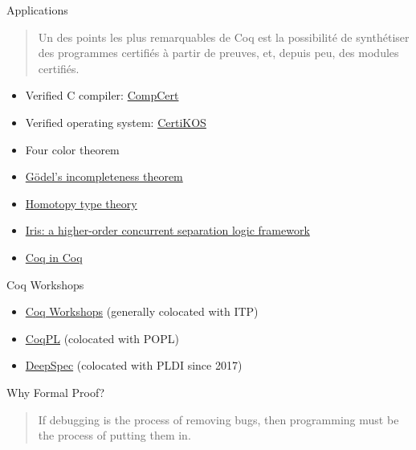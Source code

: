 \documentclass[usenames,xcolor=svgnames,11pt,sans,aspectratio=169]{beamer}
\begin{document}
\begin{frame}{Applications}
  \begin{quote}
    Un des points les plus remarquables de Coq est la possibilité de synthétiser des programmes certifiés à partir de preuves,
    et, depuis peu, des modules certifiés.

  \end{quote}
  \begin{itemize}
    \item<1-> Verified C compiler: \href{http://compcert.inria.fr}{CompCert}
    \item<2-> Verified operating system: \href{http://flint.cs.yale.edu/certikos/index.html}{CertiKOS}
    \item<3-> Four color theorem
    \item<4-> \href{http://r6.ca/Goedel/goedel1.html}{Gödel's incompleteness theorem}
    \item<5-> \href{https://github.com/HoTT/HoTT/}{Homotopy type theory}
    \item<6-> \href{https://iris-project.org}{Iris: a higher-order concurrent separation logic framework}
    \item<7-> \href{https://github.com/coq-contribs/coq-in-coq}{Coq in Coq}
  \end{itemize}
\end{frame}

\begin{frame}{Coq Workshops}
  \begin{itemize}
    \item \href{https://coq-workshop.gitlab.io}{Coq Workshops} (generally colocated with ITP)
    \item \href{https://coq.inria.fr/coqpl.html}{CoqPL} (colocated with POPL)
    \item \href{https://deepspec.org/page/Event/}{DeepSpec} (colocated with PLDI since 2017)
  \end{itemize}
\end{frame}

\begin{frame}{Why Formal Proof?}
  \linespread{1.8}
  \begin{quote}
    If debugging is the process of removing bugs, then programming must be the process of putting them in.

  \end{quote}
\end{frame}
\end{document}
